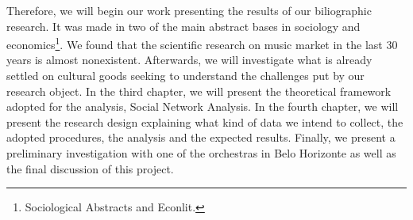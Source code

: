 \documentclass[a4paper, 12pt, openright, oneside, german, french, brazil, english, article]{abntex2}
\begin{document}

	Therefore, we will begin our work presenting the results of our biliographic research. It was made in two of the main abstract bases in sociology and economics\footnote{Sociological Abstracts and Econlit.}. We found that the scientific research on music market in the last 30 years is almost nonexistent. Afterwards, we will investigate what is already settled on cultural goods seeking to understand the challenges put by our research object. In the third chapter, we will present the theoretical framework adopted for the analysis, Social Network Analysis. In the fourth chapter, we will present the research design explaining what kind of data we intend to collect, the adopted procedures, the analysis and the expected results. Finally, we present a preliminary investigation with one of the orchestras in Belo Horizonte as well as the final discussion of this project.

\end{document}
